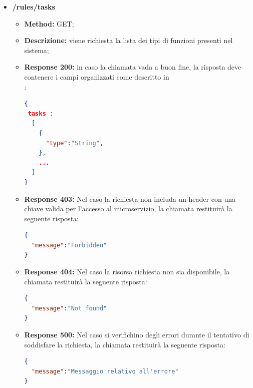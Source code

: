 \begin{itemize}
\begin{itemize}
\item \textbf{Response 200:} Nel caso la richiesta vada a buon fine, la chiamata restituirà la seguente risposta:
\begin{lstlisting}[language=json,firstnumber=1]
{
  "message":"success"
}
\end{lstlisting}
\item \textbf{Response 404:} Nel caso la richiesta fatta non rispetti il formato sopra descritto, la chiamata restituirà la seguente risposta:
\begin{lstlisting}[language=json,firstnumber=1]
{
  "message":"Not found"
}
\end{lstlisting}
\item \textbf{Response 500:} Nel caso si verifichino degli errori durante il tentativo di soddisfare la richiesta, la chiamata restituirà la seguente risposta:
\begin{lstlisting}[language=json,firstnumber=1]
{
  "message":"Messaggio relativo all'errore"
}
\end{lstlisting}\end{itemize}


\item \textbf{/rules/tasks}\\

\begin{itemize}
\item \textbf{Method:} GET;
\item \textbf{Descrizione:} viene richiesta la lista dei tipi di funzioni presenti nel sistema;
\item \textbf{Response 200:} in caso la chiamata vada a buon fine, la risposta deve contenere i campi organizzati come descritto in \\:
\begin{lstlisting}[language=json,firstnumber=1]
{
 tasks :
  [
    {
      "type":"String",
    },
    ...
  ]
}
\end{lstlisting}
\item \textbf{Response 403:} Nel caso la richiesta non includa un header  con una chiave valida per l'accesso al microservizio, la chiamata restituirà la seguente risposta:
\begin{lstlisting}[language=json,firstnumber=1]
{
  "message":"Forbidden"
}
\end{lstlisting}

\item \textbf{Response 404:} Nel caso la risorsa richiesta non sia disponibile, la chiamata restituirà la seguente risposta:
\begin{lstlisting}[language=json,firstnumber=1]
{
  "message":"Not found"
}
\end{lstlisting}
\item \textbf{Response 500:} Nel caso si verifichino degli errori durante il tentativo di soddisfare la richiesta, la chiamata restituirà la seguente risposta:
\begin{lstlisting}[language=json,firstnumber=1]
{
  "message":"Messaggio relativo all'errore"
}
\end{lstlisting}
\end{itemize}

\end{itemize}
